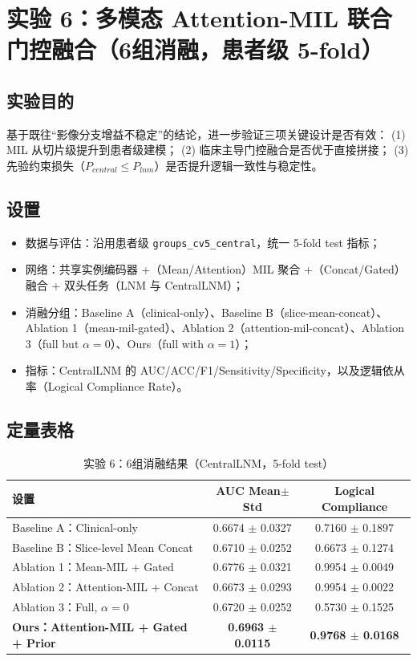\documentclass[12pt,a4paper]{ctexart}
\begin{document}
\section{实验 6：多模态 Attention-MIL 联合门控融合（6组消融，患者级 5-fold）}

\subsection{实验目的}
基于既往“影像分支增益不稳定”的结论，进一步验证三项关键设计是否有效：
(1) MIL 从切片级提升到患者级建模；
(2) 临床主导门控融合是否优于直接拼接；
(3) 先验约束损失（$P_{central}\le P_{lnm}$）是否提升逻辑一致性与稳定性。

\subsection{设置}
\begin{itemize}
  \item 数据与评估：沿用患者级 \texttt{groups\_cv5\_central}，统一 5-fold test 指标；
  \item 网络：共享实例编码器 +（Mean/Attention）MIL 聚合 +（Concat/Gated）融合 + 双头任务（LNM 与 CentralLNM）；
  \item 消融分组：Baseline A（clinical-only）、Baseline B（slice-mean-concat）、Ablation 1（mean-mil-gated）、Ablation 2（attention-mil-concat）、Ablation 3（full but $\alpha=0$）、Ours（full with $\alpha=1$）；
  \item 指标：CentralLNM 的 AUC/ACC/F1/Sensitivity/Specificity，以及逻辑依从率（Logical Compliance Rate）。
\end{itemize}

\subsection{定量表格}
\begin{table}[H]
\centering
\caption{实验 6：6组消融结果（CentralLNM，5-fold test）}
\begin{tabular}{lcc}
\toprule
设置 & AUC Mean$\pm$Std & Logical Compliance \\
\midrule
Baseline A：Clinical-only & 0.6674 $\pm$ 0.0327 & 0.7160 $\pm$ 0.1897 \\
Baseline B：Slice-level Mean Concat & 0.6710 $\pm$ 0.0252 & 0.6673 $\pm$ 0.1274 \\
Ablation 1：Mean-MIL + Gated & 0.6776 $\pm$ 0.0321 & 0.9954 $\pm$ 0.0049 \\
Ablation 2：Attention-MIL + Concat & 0.6673 $\pm$ 0.0293 & 0.9954 $\pm$ 0.0022 \\
Ablation 3：Full, $\alpha=0$ & 0.6720 $\pm$ 0.0252 & 0.5730 $\pm$ 0.1525 \\
\textbf{Ours：Attention-MIL + Gated + Prior} & \textbf{0.6963 $\pm$ 0.0115} & \textbf{0.9768 $\pm$ 0.0168} \\
\bottomrule
\end{tabular}
\end{table}
\end{document}
